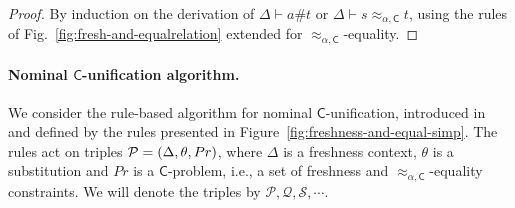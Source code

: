 \documentclass[submission,copyright,creativecommons]{eptcs}
\newcommand{\caleq}{\approx_{\alpha,\theory{C}}}
\newcommand{\theory}[1]{\ensuremath{\mathsf{#1}}}
\theoremstyle{plain}
\theoremstyle{definition}
\theoremstyle{remark}
\begin{document}
\begin{proof}
By induction on the derivation of $\Delta \vdash a \# t$ or $\Delta \vdash s \caleq t$, using the rules of Fig.~\ref{fig:fresh-and-equalrelation}
extended for $\caleq$-equality.
\end{proof}

\paragraph{Nominal \theory{C}-unification algorithm.}
We consider the rule-based algorithm for nominal $\theory{C}$-unification,  introduced  in~\cite{OnSolvingNomFPequations/frocos/Washington17} and defined by the rules presented in Figure~\ref{fig:freshness-and-equal-simp}.
The rules act on triples  ${\cal P}=(\Delta, \theta, Pr)$, where $\Delta$ is a freshness context, $\theta$ is a substitution and 
$Pr$ is a \theory{C}-problem, i.e., a set of freshness and $\caleq$-equality constraints.  
We will denote the triples by $\mathcal{P}, \mathcal{Q}, \mathcal{S},\cdots$. 

\end{document}
